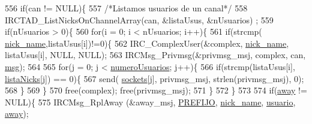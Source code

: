 \begin{DoxyCode}
{{{{{{{{{{556                                         \textcolor{keywordflow}{if}(can != NULL)\{
557                                                 \textcolor{comment}{/*Listamos usuarios de un canal*/}
558                                                 IRCTAD\_ListNicksOnChannelArray(can, &listaUsus, &nUsuarios)
      ;        
559                                                 \textcolor{keywordflow}{if}(nUsuarios > 0)\{
560                                                         \textcolor{keywordflow}{for}(i = 0; i < nUsuarios; i++)\{
561                                                                 \textcolor{keywordflow}{if}(strcmp(
      \hyperlink{_g-2361-06-_p1-_server_8c_aabbf66718cda228b924a4a9441eadf62}{nick\_name},listaUsus[i])!=0)\{
562                                                                         IRC\_ComplexUser(&complex, 
      \hyperlink{_g-2361-06-_p1-_server_8c_aabbf66718cda228b924a4a9441eadf62}{nick\_name}, listaUsus[i], NULL, NULL);
563                                                                         IRCMsg\_Privmsg(&privmsg\_msj, 
      complex, can, \hyperlink{_g-2361-06-_p1-_server_8c_a32d2f5216cddb59c7cc8fb2806a7e727}{msg});
564 
565                                                                         \textcolor{keywordflow}{for}(j = 0; j < 
      \hyperlink{_g-2361-06-_p1-_server_8c_ac9a5ec6f534d2a8e2a870179807d32dc}{numeroUsuarios}; j++)\{
566                                                                                 \textcolor{keywordflow}{if}(strcmp(listaUsus[i], 
      \hyperlink{_g-2361-06-_p1-_server_8c_a713172366a6be2fbf8456a4b43702603}{listaNicks}[j]) == 0)\{
567                                                                                         send(
      \hyperlink{_g-2361-06-_p1-_server_8c_a7724e53f22e431d1ecb6516951a172e1}{sockets}[j], privmsg\_msj, strlen(privmsg\_msj), 0);
568                                                                                 \}
569                                                                         \}
570                                                                         free(complex); free(privmsg\_msj);
571                                                                 \}
572                                                         \}
573 
574                                                         \textcolor{keywordflow}{if}(\hyperlink{_g-2361-06-_p1-_server_8c_adf86742e21384f58f8999d8317e6a370}{away} != NULL)\{
575                                                                 IRCMsg\_RplAway (&away\_msj, 
      \hyperlink{_g-2361-06-_p1-_server_8h_a78c658ff923693099f7b621e7c351129}{PREFIJO}, \hyperlink{_g-2361-06-_p1-_server_8c_aabbf66718cda228b924a4a9441eadf62}{nick\_name}, \hyperlink{_g-2361-06-_p1-_server_8c_a0147a5b81499984f9cb00379a8cb84af}{usuario}, \hyperlink{_g-2361-06-_p1-_server_8c_adf86742e21384f58f8999d8317e6a370}{away});
}}}}}}}}}}
\end{DoxyCode}
